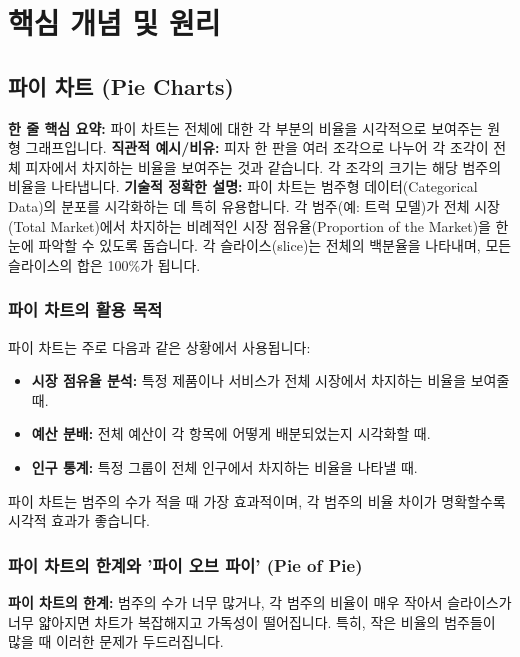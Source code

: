 \documentclass[11pt,a4paper]{article}
\begin{document}
\newpage
\section{핵심 개념 및 원리}

\subsection{파이 차트 (Pie Charts)}

\begin{conceptbox}
\textbf{한 줄 핵심 요약:} 파이 차트는 전체에 대한 각 부분의 비율을 시각적으로 보여주는 원형 그래프입니다.
\textbf{직관적 예시/비유:} 피자 한 판을 여러 조각으로 나누어 각 조각이 전체 피자에서 차지하는 비율을 보여주는 것과 같습니다. 각 조각의 크기는 해당 범주의 비율을 나타냅니다.
\textbf{기술적 정확한 설명:} 파이 차트는 범주형 데이터(Categorical Data)의 분포를 시각화하는 데 특히 유용합니다. 각 범주(예: 트럭 모델)가 전체 시장(Total Market)에서 차지하는 비례적인 시장 점유율(Proportion of the Market)을 한눈에 파악할 수 있도록 돕습니다. 각 슬라이스(slice)는 전체의 백분율을 나타내며, 모든 슬라이스의 합은 100\%가 됩니다.
\end{conceptbox}

\subsubsection{파이 차트의 활용 목적}
파이 차트는 주로 다음과 같은 상황에서 사용됩니다:
\begin{itemize}
    \item \textbf{시장 점유율 분석:} 특정 제품이나 서비스가 전체 시장에서 차지하는 비율을 보여줄 때.
    \item \textbf{예산 분배:} 전체 예산이 각 항목에 어떻게 배분되었는지 시각화할 때.
    \item \textbf{인구 통계:} 특정 그룹이 전체 인구에서 차지하는 비율을 나타낼 때.
\end{itemize}
파이 차트는 범주의 수가 적을 때 가장 효과적이며, 각 범주의 비율 차이가 명확할수록 시각적 효과가 좋습니다.

\subsubsection{파이 차트의 한계와 '파이 오브 파이' (Pie of Pie)}
\begin{warningbox}
\textbf{파이 차트의 한계:} 범주의 수가 너무 많거나, 각 범주의 비율이 매우 작아서 슬라이스가 너무 얇아지면 차트가 복잡해지고 가독성이 떨어집니다. 특히, 작은 비율의 범주들이 많을 때 이러한 문제가 두드러집니다.
\end{warningbox}
\end{document}
